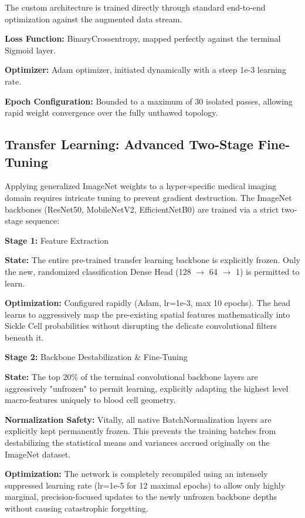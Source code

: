 The custom architecture is trained directly through standard end-to-end optimization against the augmented data stream.

\noindent\textbf{Loss Function:} BinaryCrossentropy, mapped perfectly against the terminal Sigmoid layer.

\noindent\textbf{Optimizer:} Adam optimizer, initiated dynamically with a steep 1e-3 learning rate.

\noindent\textbf{Epoch Configuration:} Bounded to a maximum of 30 isolated passes, allowing rapid weight convergence over the fully unthawed topology.

\subsection{Transfer Learning: Advanced Two-Stage Fine-Tuning}

Applying generalized ImageNet weights to a hyper-specific medical imaging domain requires intricate tuning to prevent gradient destruction. The ImageNet backbones (ResNet50, MobileNetV2, EfficientNetB0) are trained via a strict two-stage sequence:

\noindent\textbf{Stage 1:} Feature Extraction

\noindent\textbf{State:} The entire pre-trained transfer learning backbone is explicitly frozen. Only the new, randomized classification Dense Head (128 $\rightarrow$ 64 $\rightarrow$ 1) is permitted to learn.

\noindent\textbf{Optimization:} Configured rapidly (Adam, lr=1e-3, max 10 epochs). The head learns to aggressively map the pre-existing spatial features mathematically into Sickle Cell probabilities without disrupting the delicate convolutional filters beneath it.

\noindent\textbf{Stage 2:} Backbone Destabilization \& Fine-Tuning

\noindent\textbf{State:} The top 20\% of the terminal convolutional backbone layers are aggressively "unfrozen" to permit learning, explicitly adapting the highest level macro-features uniquely to blood cell geometry.

\noindent\textbf{Normalization Safety:} Vitally, all native BatchNormalization layers are explicitly kept permanently frozen. This prevents the training batches from destabilizing the statistical means and variances accrued originally on the ImageNet dataset.

\noindent\textbf{Optimization:} The network is completely recompiled using an intensely suppressed learning rate (lr=1e-5 for 12 maximal epochs) to allow only highly marginal, precision-focused updates to the newly unfrozen backbone depths without causing catastrophic forgetting.

